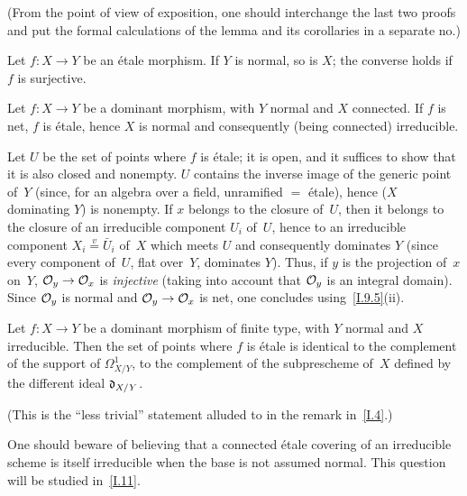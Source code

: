 (From the point of view of exposition, one should
interchange the last two proofs and put the formal
calculations of the lemma and its corollaries in a
separate no.)

\begin{corollary}
\label{I.9.10}
Let $f\colon X\to Y$ be an \'etale morphism. If $Y$ is
normal, so is $X$; the converse holds if $f$ is surjective.
\end{corollary}

\begin{corollary}
\label{I.9.11}
Let $f\colon X\to Y$ be a dominant morphism, with $Y$
normal and $X$ connected. If $f$ is net, $f$ is \'etale,
hence $X$ is normal and consequently (being connected)
irreducible.
\end{corollary}

Let $U$ be the set of points where $f$ is \'etale; it is
open, and it suffices to show that it is also closed and
nonempty. $U$ contains the inverse image of the generic
point of~$Y$ (since, for an algebra over a field,
unramified $=$ \'etale), hence ($X$ dominating $Y$) is
nonempty. If $x$ belongs to the closure of~$U$, then it
belongs to the closure of an irreducible component $U_i$
of~$U$, hence to an irreducible component
$X_i\overset{v}{=}\bar{U}_i$ of~$X$ which meets $U$ and
consequently dominates $Y$ (since every component of~$U$,
flat over~$Y$, dominates $Y$). Thus, if $y$ is the
projection of~$x$ on~$Y$, $\cal{O}_y\to\cal{O}_x$ is
\emph{injective} (taking into account that $\cal{O}_y$
is an integral domain). Since $\cal{O}_y$ is normal
and $\cal{O}_y\to\cal{O}_x$ is net, one concludes
using~\ref{I.9.5}(ii).

\begin{corollary}
\label{I.9.12}
Let $f\colon X\to Y$ be a dominant morphism of finite
type, with $Y$ normal and $X$ irreducible. Then the set
of points where $f$ is \'etale is identical to the
complement of the support of $\Omega^1_{X/Y}$, \ie to
the complement of the subprescheme of~$X$ defined by
the different ideal $\goth{d}_{X/Y}$.
\end{corollary}

(This
is the ``less trivial'' statement alluded to in the
remark in~\No\ref{I.4}.)

\begin{remark}
One should beware of believing that a connected \'etale
covering of an irreducible scheme is itself irreducible
when the base is not assumed normal. This question
will be studied in~\No\ref{I.11}.
\end{remark}
